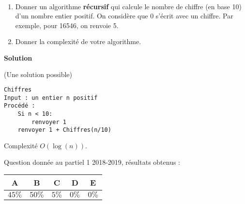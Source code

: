 
\begin{exercice}[Partiel 2018-2019]~

\begin{enumerate}
\item Donner un algorithme \textbf{récursif} qui calcule le nombre de chiffre (en base 10) d'un nombre entier positif. On considère que 0 s'écrit avec un chiffre.
Par exemple, pour 16546, on renvoie 5. 

\item Donner la complexité de votre algorithme.
\end{enumerate}

\textbf{Solution}

(Une solution possible)

\begin{lstlisting}
Chiffres
Input : un entier n positif
Procédé :
    Si n < 10:
        renvoyer 1
    renvoyer 1 + Chiffres(n/10)
\end{lstlisting}

Complexité $O(\log(n))$.

Question donnée au partiel 1 2018-2019, résultats obtenus :

\begin{tabular}{|c|c|c|c|c|}
\hline
A & B & C & D & E \\ \hline
$45\%$ & $50\%$ & $5\%$ & $0\%$ & $0\%$ \\ \hline
\end{tabular} 


\end{exercice}